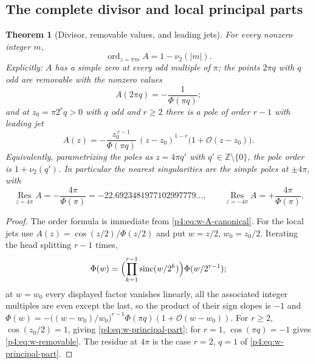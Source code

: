 \documentclass[11pt,oneside]{article}
\numberwithin{equation}{section}
\newtheorem{theorem}{Theorem}[section]
\theoremstyle{definition}
\theoremstyle{remark}
\newcommand{\Z}{\mathbb Z}
\newcommand{\sinc}{\operatorname{sinc}}
\newcommand{\ord}{\operatorname{ord}}
\newcommand{\Res}{\operatorname*{Res}}
\newcommand{\vtwo}{\nu_2}
\newcommand{\bigO}{\mathcal O}
\begin{document}
\subsection{The complete divisor and local principal parts}

\begin{theorem}[Divisor, removable values, and leading jets]
\label{p4:thm:w-divisor}
For every nonzero integer $m$,
\begin{equation}
 \ord_{z=\pi m}A=1-\vtwo(|m|).
 \label{p4:eq:w-divisor}
\end{equation}
Explicitly: $A$ has a simple zero at every odd multiple of $\pi$; the points
$2\pi q$ with $q$ odd are removable with the nonzero values
\begin{equation}
 A(2\pi q)=-\frac1{\Phi(\pi q)};
 \label{p4:eq:w-removable}
\end{equation}
and at $z_0=\pi2^rq>0$ with $q$ odd and $r\ge2$ there is a pole of order
$r-1$ with leading jet
\begin{equation}
 A(z)=-\frac{z_0^{\,r-1}}{\Phi(\pi q)}\,
 (z-z_0)^{1-r}\bigl(1+\bigO(z-z_0)\bigr).
 \label{p4:eq:w-principal-part}
\end{equation}
Equivalently, parametrizing the poles as $z=4\pi q'$ with
$q'\in\Z\setminus\{0\}$, the pole order is $1+\vtwo(q')$.  In particular the
nearest singularities are the simple poles at $\pm4\pi$, with
\begin{equation}
 \Res_{z=4\pi}A=-\frac{4\pi}{\Phi(\pi)}
 =-22.6923481977102997779\ldots,
 \qquad
 \Res_{z=-4\pi}A=+\frac{4\pi}{\Phi(\pi)}.
 \label{p4:eq:w-residues}
\end{equation}
\end{theorem}

\begin{proof}
The order formula is immediate from \eqref{p4:eq:w-A-canonical}.  For the local
jets use $A(z)=\cos(z/2)/\Phi(z/2)$ and put $w=z/2$, $w_0=z_0/2$.  Iterating
the head splitting $r-1$ times,
\[
 \Phi(w)=\Bigl(\prod_{k=1}^{r-1}\sinc(w/2^k)\Bigr)\Phi(w/2^{r-1});
\]
at $w=w_0$ every displayed factor vanishes linearly, all the associated
integer multiples are even except the last, so the product of their sign
slopes is $-1$ and
$\Phi(w)=-\bigl((w-w_0)/w_0\bigr)^{r-1}\Phi(\pi q)(1+\bigO(w-w_0))$.
For $r\ge2$, $\cos(z_0/2)=1$, giving \eqref{p4:eq:w-principal-part}; for $r=1$,
$\cos(\pi q)=-1$ gives \eqref{p4:eq:w-removable}.  The residue at $4\pi$ is the
case $r=2$, $q=1$ of \eqref{p4:eq:w-principal-part}.
\end{proof}
\end{document}
